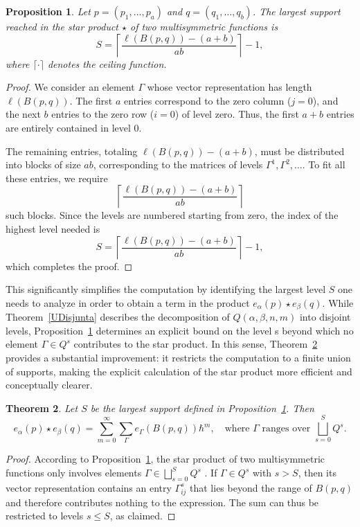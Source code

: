 \documentclass[11pt]{article}
\newtheorem{thm}{Theorem}%
\newtheorem{prop}[thm]{Proposition} %
\begin{document}
\begin{prop}\label{Mmayor}
Let $p = (p_1,\ldots,p_a)$ and $q = (q_1,\ldots,q_b)$. The largest support reached in the star product $\star $ of two multisymmetric functions is
$$
S = \left\lceil \frac{\ell(B(p,q)) - (a + b)}{ab} \right\rceil - 1,
$$
where $ \lceil\cdot\rceil $ denotes the ceiling function.
\end{prop}

\begin{proof}
We consider an element \(\Gamma\) whose vector representation has length \(\ell(B(p,q))\). The first \(a\) entries correspond to the zero column (\(j = 0\)), and the next \(b\) entries to the zero row (\(i = 0\)) of level zero. Thus, the first \(a + b\) entries are entirely contained in level 0.

The remaining entries, totaling \(\ell(B(p,q)) - (a + b)\), must be distributed into blocks of size \(ab\), corresponding to the matrices of levels \(\Gamma^1, \Gamma^2, \dots\). To fit all these entries, we require
\[
\left\lceil \frac{\ell(B(p,q)) - (a + b)}{ab} \right\rceil
\]
such blocks. Since the levels are numbered starting from zero, the index of the highest level needed is
\[
S = \left\lceil \frac{\ell(B(p,q)) - (a + b)}{ab} \right\rceil - 1,
\]
which completes the proof.
\end{proof}

This significantly simplifies the computation by identifying the largest level $S$ one needs to analyze in order to obtain a term in the product $e_{\alpha}(p) \star e_{\beta}(q)$.
While Theorem~\ref{UDisjunta} describes the decomposition of $Q(\alpha,\beta,n,m)$ into disjoint levels, Proposition~\ref{Mmayor} determines an explicit bound on the level s beyond which no element $\Gamma \in Q^s$ contributes to the star product.
In this sense, Theorem~\ref{SMayor} provides a substantial improvement: it restricts the computation to a finite union of supports, making the explicit calculation of the star product more efficient and conceptually clearer.






\begin{thm}\label{SMayor}
Let $S$ be the largest support defined in Proposition~\ref{Mmayor}. Then
$$
e_{\alpha}(p)\star e_{\beta}(q)=\sum_{m=0}^{\infty} \sum_{\Gamma} e_\Gamma(B(p,q)) \hbar^m, \quad \text{where } \Gamma \text{ ranges over } \bigsqcup_{s=0}^{S} Q^{s}.
$$
\end{thm}

\begin{proof}
According to Proposition~\ref{Mmayor}, the star product of two multisymmetric functions only involves elements $\Gamma \in \bigsqcup_{s=0}^{S} Q^{s} $ . If $ \Gamma \in Q^{s} $ with $ s > S $, then its vector representation contains an entry $ \Gamma_{ij}^{s}$ that lies beyond the range of $B(p,q)$ and therefore contributes nothing to the expression. The sum can thus be restricted to levels $ s \leq S$, as claimed.
\end{proof}
\end{document}
